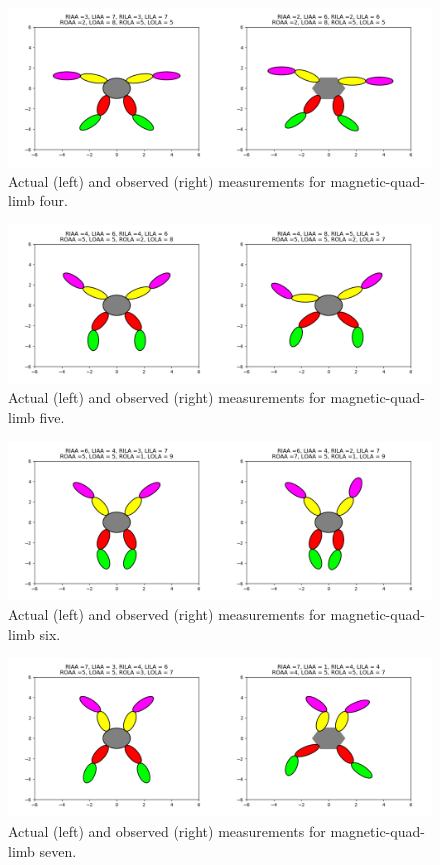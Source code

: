 \documentclass{article}
\begin{document}
\begin{figure}[!ht]
	\centering
	\includegraphics[width=120mm]{figs/mql-4.png}
	\caption{Actual (left) and observed (right) measurements for magnetic-quad-limb four.}
\end{figure}
\begin{figure}[!ht]
	\centering
	\includegraphics[width=120mm]{figs/mql-5.png}
	\caption{Actual (left) and observed (right) measurements for magnetic-quad-limb five.}
\end{figure}
\begin{figure}[!ht]
	\centering
	\includegraphics[width=120mm]{figs/mql-6.png}
	\caption{Actual (left) and observed (right) measurements for magnetic-quad-limb six.}
\end{figure}
\begin{figure}[!ht]
	\centering
	\includegraphics[width=120mm]{figs/mql-7.png}
	\caption{Actual (left) and observed (right) measurements for magnetic-quad-limb seven.}
\end{figure}
\end{document}
